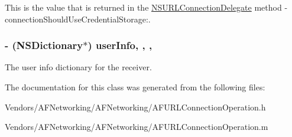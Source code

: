 This is the value that is returned in the {\ttfamily \hyperlink{class_n_s_u_r_l_connection_delegate-p}{N\+S\+U\+R\+L\+Connection\+Delegate}} method {\ttfamily -\/connection\+Should\+Use\+Credential\+Storage\+:}. \hypertarget{interface_a_f_u_r_l_connection_operation_a9e684ec568c6dd79497ef36b84511d15}{}
\subsubsection[{user\+Info}]{\setlength{\rightskip}{0pt plus 5cm}-\/ (N\+S\+Dictionary$\ast$) user\+Info\hspace{0.3cm}{\ttfamily [read]}, {\ttfamily [write]}, {\ttfamily [nonatomic]}, {\ttfamily [strong]}}\label{interface_a_f_u_r_l_connection_operation_a9e684ec568c6dd79497ef36b84511d15}
The user info dictionary for the receiver. 

The documentation for this class was generated from the following files\+:\begin{DoxyCompactItemize}
\item 
Vendors/\+A\+F\+Networking/\+A\+F\+Networking/A\+F\+U\+R\+L\+Connection\+Operation.\+h\item 
Vendors/\+A\+F\+Networking/\+A\+F\+Networking/A\+F\+U\+R\+L\+Connection\+Operation.\+m\end{DoxyCompactItemize}
